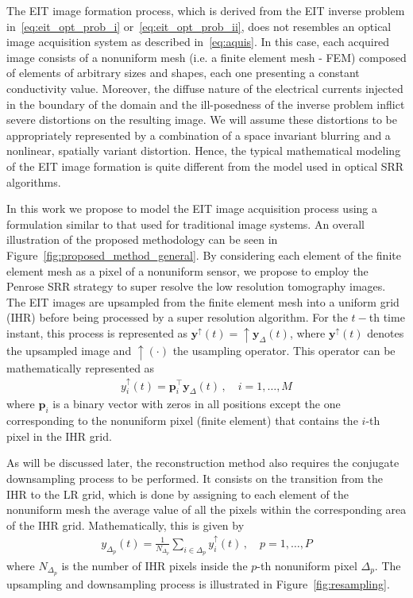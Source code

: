 \documentclass[10pt]{IEEEtran}
\newcommand{\cred}{}
\newcommand{\vp}{\mathbf{\textstyle{p}}}
\newcommand{\vy}{\mathbf{y}}
\begin{document}
The EIT image formation process, which is derived from the EIT inverse problem in~\eqref{eq:eit_opt_prob_i} or~\eqref{eq:eit_opt_prob_ii}, does not resembles an optical image acquisition system as described in~\eqref{eq:aquis}.
%
In this case, each acquired image consists of a nonuniform mesh (i.e. a finite element mesh - FEM) composed of elements of arbitrary sizes and shapes, each one presenting a constant conductivity value. Moreover, the diffuse nature of the electrical currents injected in the boundary of the domain and the ill-posedness of the inverse problem inflict severe distortions on the resulting image. We will assume these distortions to be appropriately represented by a combination of a space invariant blurring and a nonlinear, spatially variant distortion. Hence, the typical mathematical modeling of the EIT image formation is quite different from the model used in optical SRR algorithms.


In this work we propose to model the EIT image acquisition process using a formulation similar to that used for traditional image systems. An overall illustration of the proposed methodology can be seen in Figure~\ref{fig:proposed_method_general}. By considering each element of the finite element mesh as a pixel of a nonuniform sensor, we propose to employ the Penrose SRR strategy to super resolve the low resolution tomography images. The EIT images are upsampled from the finite element mesh into a uniform grid (IHR) before being processed by a super resolution algorithm.
%
For the $t-$th time instant, this process is represented as $\vy^{\uparrow}(t)=\uparrow\vy_{\Delta}(t)$, where $\vy^{\uparrow}(t)$ denotes the upsampled image and $\uparrow(\cdot)$ the usampling operator.
%
This operator can be mathematically represented as
\begin{align}
    y_i^{\uparrow}(t) {}={} \vp_i^\top \vy_{\Delta}(t) \,, \quad i=1,\ldots,M
\end{align}
where $\vp_i$ is a binary vector with zeros in all positions except the one corresponding to the nonuniform pixel (finite element) that contains the $i$-th pixel in the IHR grid.



As will be discussed later, the reconstruction method also requires the conjugate downsampling process to be performed. It consists on the transition from the IHR to the LR grid, which is done by assigning to each element of the nonuniform mesh the average value of all the pixels within the corresponding area of the IHR grid.
\cred{Mathematically, this is given by
\begin{align}
    y_{\Delta_p}(t) {}={} \frac{1}{N_{\Delta_p}} \sum_{i\in\Delta_p} y_i^{\uparrow}(t) \,,
    \quad p=1,\ldots,P
\end{align}
where $N_{\Delta_p}$ is the number of IHR pixels inside the $p$-th nonuniform pixel $\Delta_p$.} \cred{The upsampling and downsampling} process is illustrated in Figure~\ref{fig:resampling}.
\end{document}
